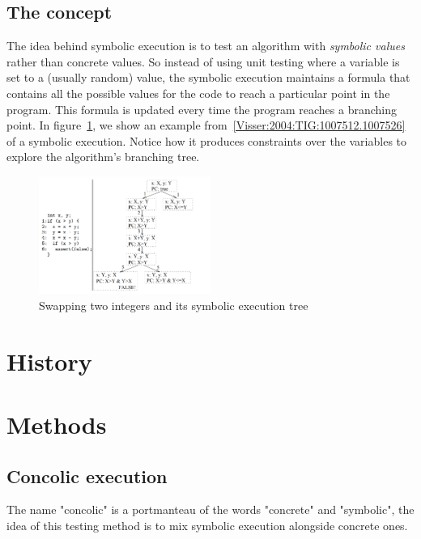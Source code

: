 \documentclass[11pt]{article}
\begin{document}
    \subsection{The concept}
      The idea behind symbolic execution is to test an algorithm with \emph{symbolic values} rather than concrete values. So instead of using unit testing where a variable is set to a (usually random) value, the symbolic execution maintains a formula that contains all the possible values for the code to reach a particular point in the program. This formula is updated every time the program reaches a branching point. In figure~\ref{fig:symbolicsimple}, we show an example from~\ref{Visser:2004:TIG:1007512.1007526}  of a symbolic execution. Notice how it produces constraints over the variables to explore the algorithm's branching tree.
      \begin{figure}
        \includegraphics[width=0.5\textwidth]{symbolicsimple}
        \caption{Swapping two integers and its symbolic execution tree}
        \label{fig:symbolicsimple}
      \end{figure}

  \section{History}

  \section{Methods}
    
    \subsection{Concolic execution}
    \label{subsec:concolicExecution}
    	The name "concolic" is a portmanteau of the words "concrete" and "symbolic", the idea of this testing method is to mix symbolic execution alongside concrete ones.\\
    	
\end{document}

